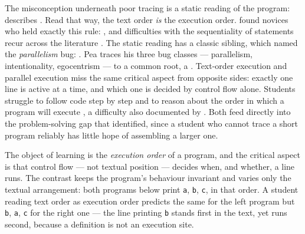 The misconception underneath poor tracing is a static reading of the program:
\textcite[p.~235]{Sorva2012Dissertation} describes
.
Read that way, the text order \emph{is} the execution order.
\textcite{Sleeman1984} found novices who held exactly this rule:
, and difficulties
with the sequentiality of statements recur across the literature
\autocite[Table~A.1, p.~360]{Sorva2012Dissertation}.
The static reading has a classic sibling, which \textcite{Pea1986Superbug}
named the \emph{parallelism} bug:
. Pea traces his three bug classes --- parallelism,
intentionality, egocentrism --- to a common root, a
. Text-order execution and parallel
execution miss the same critical aspect from opposite sides: exactly one
line is active at a time, and which one is decided by control flow alone.
Students struggle to follow code step by step and to reason about the order in
which a program will execute \autocite[p.~20]{Sleeman1984}, a difficulty also
documented by \textcite{Kurvinen2016}. Both feed directly into the
problem-solving gap that \textcite{Lister2004Tracing} identified, since a
student who cannot trace a short program reliably has little hope of assembling
a larger one.


The object of learning is the \emph{execution order} of a program, and the
critical aspect is that control flow --- not textual position --- decides
when, and whether, a line runs.
The contrast keeps the program's behaviour invariant and varies only the
textual arrangement: both programs below print
\texttt{a}, \texttt{b}, \texttt{c}, in
that order.
A student reading text order as execution order predicts the same for the
left program but \texttt{b}, \texttt{a},
\texttt{c} for the right one --- the line printing
\texttt{b} stands first in the text, yet runs second, because a
definition is not an execution site.

